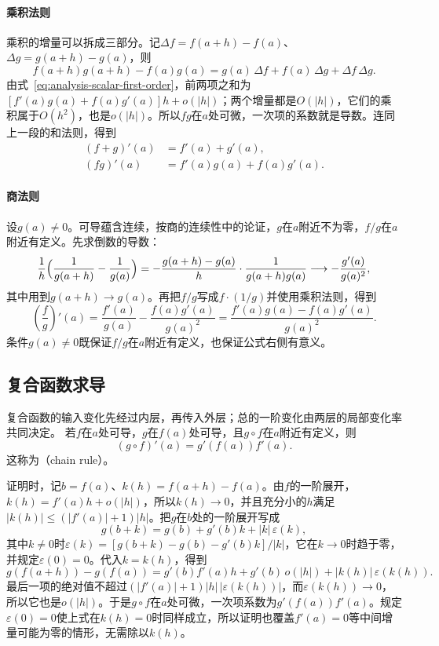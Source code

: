 \paragraph{乘积法则}
乘积的增量可以拆成三部分。记$\Delta f=f(a+h)-f(a)$、$\Delta g=g(a+h)-g(a)$，则
\[
 f(a+h)g(a+h)-f(a)g(a)=g(a)\,\Delta f+f(a)\,\Delta g+\Delta f\,\Delta g.
\]
由式~\eqref{eq:analysis-scalar-first-order}，前两项之和为$[f'(a)g(a)+f(a)g'(a)]h+o(|h|)$；两个增量都是$O(|h|)$，它们的乘积属于$O(h^2)$，也是$o(|h|)$。所以$fg$在$a$处可微，一次项的系数就是导数。连同上一段的和法则，得到
\begin{equation}
 \begin{aligned}
 (f+g)'(a)&=f'(a)+g'(a),\\
 (fg)'(a)&=f'(a)g(a)+f(a)g'(a).
 \end{aligned}
\label{eq:analysis-scalar-sum-product-rules}
\end{equation}

\paragraph{商法则}
设$g(a)\neq0$。可导蕴含连续，按商的连续性中的论证，$g$在$a$附近不为零，$f/g$在$a$附近有定义。先求倒数的导数：
\[
 \frac1h\Bigl(\frac1{g(a+h)}-\frac1{g(a)}\Bigr)
 =-\frac{g(a+h)-g(a)}h\cdot\frac1{g(a+h)g(a)}
 \longrightarrow-\frac{g'(a)}{g(a)^2},
\]
其中用到$g(a+h)\to g(a)$。再把$f/g$写成$f\cdot(1/g)$并使用乘积法则，得到
\[
 \left(\frac fg\right)'(a)
 =\frac{f'(a)}{g(a)}-\frac{f(a)g'(a)}{g(a)^2}
 =\frac{f'(a)g(a)-f(a)g'(a)}{g(a)^2}.
\]
条件$g(a)\neq0$既保证$f/g$在$a$附近有定义，也保证公式右侧有意义。

\subsection{复合函数求导}

复合函数的输入变化先经过内层，再传入外层；总的一阶变化由两层的局部变化率共同决定。
若$f$在$a$处可导，$g$在$f(a)$处可导，且$g\circ f$在$a$附近有定义，则
\begin{equation}
 (g\circ f)'(a)=g'(f(a))f'(a).
\label{eq:analysis-scalar-chain-rule}
\end{equation}
这称为（chain rule）。

证明时，记$b=f(a)$、$k(h)=f(a+h)-f(a)$。由$f$的一阶展开，$k(h)=f'(a)h+o(|h|)$，所以$k(h)\to0$，并且充分小的$h$满足$|k(h)|\leq(|f'(a)|+1)|h|$。把$g$在$b$处的一阶展开写成
\[
 g(b+k)=g(b)+g'(b)k+|k|\,\varepsilon(k),
\]
其中$k\neq0$时$\varepsilon(k)=[g(b+k)-g(b)-g'(b)k]/|k|$，它在$k\to0$时趋于零，并规定$\varepsilon(0)=0$。代入$k=k(h)$，得到
\[
 g(f(a+h))-g(f(a))=g'(b)f'(a)h+g'(b)\,o(|h|)+|k(h)|\,\varepsilon(k(h)).
\]
最后一项的绝对值不超过$(|f'(a)|+1)|h|\,|\varepsilon(k(h))|$，而$\varepsilon(k(h))\to0$，所以它也是$o(|h|)$。于是$g\circ f$在$a$处可微，一次项系数为$g'(f(a))f'(a)$。规定$\varepsilon(0)=0$使上式在$k(h)=0$时同样成立，所以证明也覆盖$f'(a)=0$等中间增量可能为零的情形，无需除以$k(h)$。

